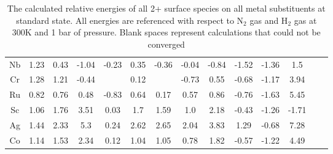 \begin{table}
\begin{center}
\begin{tabular}{| c | c | c | c | c | c | c | c | c | c | c | c | c | c |}
Nb & 1.23 & 0.43 & -1.04 & -0.23 & 0.35 & -0.36 & -0.04 & -0.84 & -1.52 & -1.36 & 1.5 \\
Cr & 1.28 & 1.21 & -0.44 &  & 0.12 &  & -0.73 & 0.55 & -0.68 & -1.17 & 3.94 \\
Ru & 0.82 & 0.76 & 0.48 & -0.83 & 0.64 & 0.17 & 0.57 & 0.86 & -0.76 & -1.63 & 5.45 \\
Sc & 1.06 & 1.76 & 3.51 & 0.03 & 1.7 & 1.59 & 1.0 & 2.18 & -0.43 & -1.26 & -1.71 \\
Ag & 1.44 & 2.33 & 5.3 & 0.24 & 2.62 & 2.65 & 2.04 & 3.83 & 1.29 & -0.68 & 7.28 \\
Co & 1.14 & 1.53 & 2.34 & 0.12 & 1.04 & 1.05 & 0.78 & 1.82 & -0.57 & -1.22 & 4.49 \\
\hline
\end{tabular}
\end{center}
\caption{The calculated relative energies of all 2+ surface species on all metal substituents at standard state. All energies are referenced with respect to N$_2$ gas and H$_2$ gas at 300K and 1 bar of pressure. Blank spaces represent calculations that could not be converged}
\label{table:energies}
\end{table}

